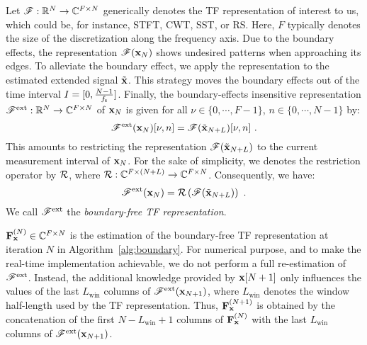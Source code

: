 Let ${\mathscr F}:{\mathbb R}^{N}\to\mathbb C^{F\times N}$ generically denotes the TF representation of interest to us, which could be, for instance, STFT, CWT, SST, or RS. Here, $F$ typically denotes the size of the discretization along the frequency axis. Due to the boundary effects, the representation ${\mathscr F}({\mathbf x}_N)$ shows undesired patterns when approaching its edges. %
To alleviate the boundary effect, we apply the representation to the estimated extended signal $\tilde{{\mathbf x}}$. This strategy moves the boundary effects out of the time interval $I=[0, \frac{N-1}{f_{\mathsf s}}]$. Finally, the boundary-effects insensitive representation ${\mathscr F}^{\mathrm{ext}}:{\mathbb R}^{N}\to\mathbb C^{F\times N}$ of ${\mathbf x}_N$ is given for all $\nu\in\{0,\cdots,F-1\}$, $n\in\{0,\cdots,N-1\}$ by:
\begin{equation}
\ccF^{\mathrm{ext}}(\bx_N)[\nu,n] = \ccF(\tilde \bx_{N+L})[\nu,n]\ .
\label{eq:restriction}
\end{equation}
This amounts to restricting the representation ${\mathscr F}(\tilde {{\mathbf x}}_{N+L})$ to the current measurement interval of ${\mathbf x}_N$. For the sake of simplicity, we denotes the restriction operator by ${\mathcal R}$, where ${\mathcal R}:\mathbb C^{F\times (N+L)}\to\mathbb C^{F\times N}$. Consequently, we have:
\begin{equation}
\ccF^{\mathrm{ext}}(\bx_N) = \cR\left( \ccF(\tilde \bx_{N+L}) \right) \ .
\label{eq:bound.free.TFR}
\end{equation}
We call ${\mathscr F}^{\mathrm{ext}}$ the {\em boundary-free TF representation}.

${\mathbf F}_{\mathbf x}^{(N)}\in\mathbb C^{F\times N}$ is the estimation of the boundary-free TF representation at iteration $N$ in Algorithm~\ref{alg:boundary}. For numerical purpose, and to make the real-time implementation achievable, we do not perform a full re-estimation of ${\mathscr F}^{\mathrm{ext}}$. Instead, the additional knowledge provided by ${\mathbf x}[N+1]$ only influences the values of the last $L_{\mathrm{win}}$ columns of ${\mathscr F}^{\mathrm{ext}}({\mathbf x}_{N+1})$, where $L_{\mathrm{win}}$ denotes the window half-length used by the TF representation. Thus, ${\mathbf F}_{\mathbf x}^{(N+1)}$ is obtained by the concatenation of the first $N-L_{\mathrm{win}}+ 1$ columns of ${\mathbf F}_{\mathbf x}^{(N)}$ with the last $L_{\mathrm{win}}$ columns of ${\mathscr F}^{\mathrm{ext}}({\mathbf x}_{N+1})$.


